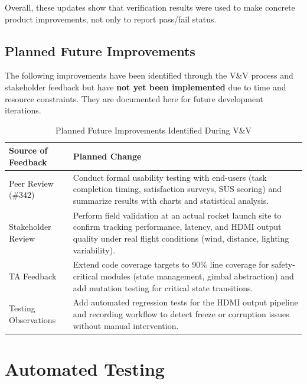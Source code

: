 \documentclass[12pt, titlepage]{article}
\begin{document}
Overall, these updates show that verification results were used to make
concrete product improvements, not only to report pass/fail status.

\subsection{Planned Future Improvements}

The following improvements have been identified through the V\&V process and
stakeholder feedback but have \textbf{not yet been implemented} due to time and
resource constraints. They are documented here for future development
iterations.

\begin{table}[H]
  \centering
  \caption{Planned Future Improvements Identified During V\&V}
  \label{TblPlannedFutureChanges}
  \begin{tabularx}{\textwidth}{|>{\raggedright\arraybackslash}p{4.5cm}|X|}
    \hline
    \textbf{Source of Feedback} & \textbf{Planned Change} \\
    \hline
    Peer Review (\#342)         &
    Conduct formal usability testing with end-users (task completion timing,
    satisfaction surveys, SUS scoring) and summarize results with charts and
    statistical analysis.                                 \\
    \hline
    Stakeholder Review          &
    Perform field validation at an actual rocket launch site to confirm
    tracking performance, latency, and HDMI output quality under real flight
    conditions (wind, distance, lighting variability).    \\
    \hline
    TA Feedback                 &
    Extend code coverage targets to 90\% line coverage for safety-critical
    modules (state management, gimbal abstraction) and add mutation testing
    for critical state transitions.                       \\
    \hline
    Testing Observations        &
    Add automated regression tests for the HDMI output pipeline and recording
    workflow to detect freeze or corruption issues without manual
    intervention.                                         \\
    \hline
  \end{tabularx}
\end{table}

\section{Automated Testing}
\label{sec:automated_testing}
\end{document}
